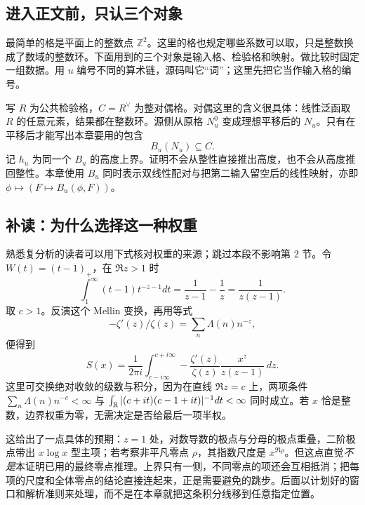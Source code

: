 \subsection{进入正文前，只认三个对象}
最简单的格是平面上的整数点 $\mathbb Z^2$。这里的格也规定哪些系数可以取，只是整数换成了数域的整数环。下面用到的三个对象是输入格、检验格和映射。做比较时固定一组数据。用 $u$ 编号不同的算术链，源码叫它“词”；这里先把它当作输入格的编号。

写 $R$ 为公共检验格，$C=R^\vee$ 为整对偶格。对偶这里的含义很具体：线性泛函取 $R$ 的任意元素，结果都在整数环。源侧从原格 $N_u^0$ 变成理想平移后的 $N_u$。只有在平移后才能写出本章要用的包含
\[
       B_u(N_u)\subseteq C.
\]
记 $h_u$ 为同一个 $B_u$ 的高度上界。证明不会从整性直接推出高度，也不会从高度推回整性。本章使用 $B_u$ 同时表示双线性配对与把第二输入留空后的线性映射，亦即 $\phi\mapsto (F\mapsto B_u(\phi,F))$。


\subsection{补读：为什么选择这一种权重}
熟悉复分析的读者可以用下式核对权重的来源；跳过本段不影响第 2 节。令 $W(t)=(t-1)_+$，在 $\Re z>1$ 时
\[
 \int_1^\infty(t-1)t^{-z-1}dt
  =\frac1{z-1}-\frac1z=\frac1{z(z-1)}.
\]
取 $c>1$。反演这个 Mellin 变换，再用等式
\[
 -\zeta'(z)/\zeta(z)=\sum_n\Lambda(n)n^{-z},
\]
便得到
\[
 S(x)=\frac{1}{2\pi i}\int_{c-i\infty}^{c+i\infty}
     -\frac{\zeta'(z)}{\zeta(z)}
       \frac{x^z}{z(z-1)}\,dz .
\]
这里可交换绝对收敛的级数与积分，因为在直线 $\Re z=c$ 上，两项条件
$\sum_n\Lambda(n)n^{-c}<\infty$ 与
$\int_\mathbb R |(c+it)(c-1+it)|^{-1}dt<\infty$ 同时成立。若 $x$ 恰是整数，边界权重为零，无需决定是否给最后一项半权。

这给出了一点具体的预期：$z=1$ 处，对数导数的极点与分母的极点重叠，二阶极点带出 $x\log x$ 型主项；若考察非平凡零点 $\rho$，其指数尺度是 $x^{\Re\rho}$。但这点直觉\emph{不是}本证明已用的最终零点推理。上界只有一侧，不同零点的项还会互相抵消；把每项的尺度和全体零点的结论直接连起来，正是需要避免的跳步。后面以计划好的窗口和解析准则来处理，而不是在本章就把这条积分线移到任意指定位置。

